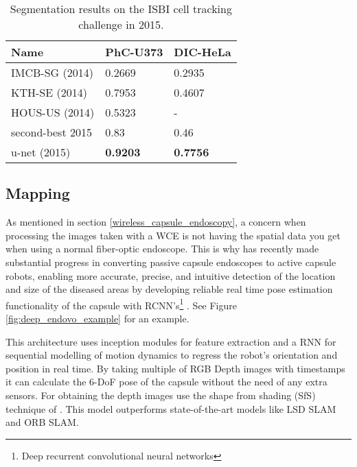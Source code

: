 \documentclass[thesis.tex]{subfiles}
\begin{document}
\begin{table} %
  \centering
  \begin{tabular}{ l l l }
  	\hline
    Name &				PhC-U373 &			DIC-HeLa 		\\
    \hline
    IMCB-SG (2014) &	0.2669 & 			0.2935 			\\
    KTH-SE (2014) &		0.7953 & 			0.4607 			\\ 
    HOUS-US (2014) &	0.5323 & 			- 				\\ 
    second-best 2015 &	0.83 & 				0.46 			\\
    u-net (2015) &		\textbf{0.9203} & 	\textbf{0.7756} \\
    \hline
  \end{tabular}
  \caption[Segmentation results on the ISBI cell tracking challenge in 2015]{Segmentation results on the ISBI cell tracking challenge in 2015.}
  \label{tab:segmentation_results}
\end{table}


\subsection{Mapping} \label{mapping}
As mentioned in section \ref{wireless_capsule_endoscopy}, a concern when processing the images taken with a WCE is not having the spatial data you get when using a normal fiber-optic endoscope. This is why \citeauthor*{DeepEndoVO18} has recently made substantial progress in converting passive capsule endoscopes to active capsule robots, enabling more accurate, precise, and intuitive detection of the location and size of the diseased areas by developing reliable real time pose estimation functionality of the capsule with RCNN's\footnote{Deep recurrent convolutional neural networks} \cite{DeepEndoVO18}. See Figure \ref{fig:deep_endovo_example} for an example.

This architecture uses inception modules for feature extraction and a RNN for sequential modelling of motion dynamics to regress the robot's orientation and position in real time. By taking multiple of RGB Depth images with timestamps it can calculate the 6-DoF pose of the capsule without the need of any extra sensors. For obtaining the depth images \citeauthor*{DeepEndoVO18} use the shape from shading (SfS) technique of \citeauthor{ShapeShading94} \cite{ShapeShading94}. This model outperforms state-of-the-art models like LSD SLAM and ORB SLAM.
\end{document}
